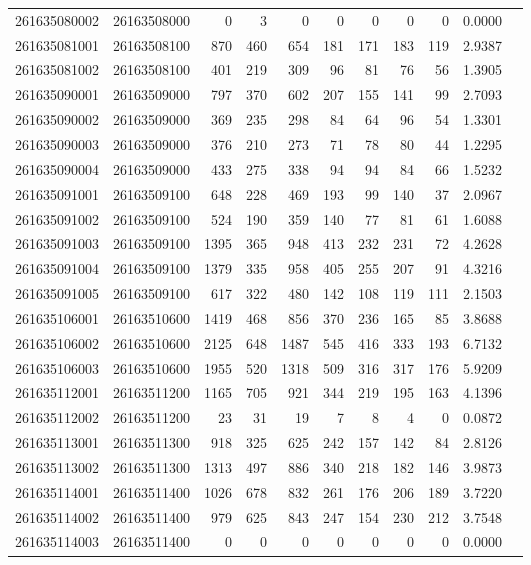 \documentclass[11pt,landscape]{article}
\begin{document}
{\begin{longtable}[]{@{}lrrrrrrrrrr@{}}
261635080002 & 26163508000 & 0 & 3 & 0 & 0 & 0 & 0 & 0 & 0.0000 \\
261635081001 & 26163508100 & 870 & 460 & 654 & 181 & 171 & 183 & 119 & 2.9387 \\
261635081002 & 26163508100 & 401 & 219 & 309 & 96 & 81 & 76 & 56 & 1.3905 \\
261635090001 & 26163509000 & 797 & 370 & 602 & 207 & 155 & 141 & 99 & 2.7093 \\
261635090002 & 26163509000 & 369 & 235 & 298 & 84 & 64 & 96 & 54 & 1.3301 \\
261635090003 & 26163509000 & 376 & 210 & 273 & 71 & 78 & 80 & 44 & 1.2295 \\
261635090004 & 26163509000 & 433 & 275 & 338 & 94 & 94 & 84 & 66 & 1.5232 \\
261635091001 & 26163509100 & 648 & 228 & 469 & 193 & 99 & 140 & 37 & 2.0967 \\
261635091002 & 26163509100 & 524 & 190 & 359 & 140 & 77 & 81 & 61 & 1.6088 \\
261635091003 & 26163509100 & 1395 & 365 & 948 & 413 & 232 & 231 & 72 & 4.2628 \\
261635091004 & 26163509100 & 1379 & 335 & 958 & 405 & 255 & 207 & 91 & 4.3216 \\
261635091005 & 26163509100 & 617 & 322 & 480 & 142 & 108 & 119 & 111 & 2.1503 \\
261635106001 & 26163510600 & 1419 & 468 & 856 & 370 & 236 & 165 & 85 & 3.8688 \\
261635106002 & 26163510600 & 2125 & 648 & 1487 & 545 & 416 & 333 & 193 & 6.7132 \\
261635106003 & 26163510600 & 1955 & 520 & 1318 & 509 & 316 & 317 & 176 & 5.9209 \\
261635112001 & 26163511200 & 1165 & 705 & 921 & 344 & 219 & 195 & 163 & 4.1396 \\
261635112002 & 26163511200 & 23 & 31 & 19 & 7 & 8 & 4 & 0 & 0.0872 \\
261635113001 & 26163511300 & 918 & 325 & 625 & 242 & 157 & 142 & 84 & 2.8126 \\
261635113002 & 26163511300 & 1313 & 497 & 886 & 340 & 218 & 182 & 146 & 3.9873 \\
261635114001 & 26163511400 & 1026 & 678 & 832 & 261 & 176 & 206 & 189 & 3.7220 \\
261635114002 & 26163511400 & 979 & 625 & 843 & 247 & 154 & 230 & 212 & 3.7548 \\
261635114003 & 26163511400 & 0 & 0 & 0 & 0 & 0 & 0 & 0 & 0.0000 \\

\end{longtable}}
\end{document}
